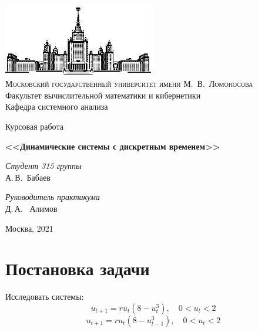 \documentclass[11pt]{article}
\begin{document}
	
	\thispagestyle{empty}
	
	\begin{center}
		\ \vspace{-3cm}
		
		\includegraphics[width=0.5\textwidth]{msu.eps}\\
		{\scshape Московский государственный университет имени М.~В.~Ломоносова}\\
		Факультет вычислительной математики и кибернетики\\
		Кафедра системного анализа
		
		\vfill
		
		{\LARGE Курсовая работа}
		
		\vspace{1cm}
		
		{\Huge\bfseries <<Динамические системы с дискретным временем>>}
	\end{center}
	
	\vspace{1cm}
	
	\begin{flushright}
		\large
		\textit{Студент 315 группы}\\
		А.\,В.~Бабаев
		
		\vspace{5mm}
		
		\textit{Руководитель практикума}\\
		Д.\,А.~ Алимов
	\end{flushright}
	
	\vfill
	
	\begin{center}
		Москва, 2021
	\end{center}
	
	\newpage
	\tableofcontents
	\newpage
	
	{\vspace*{-2cm} \hspace*{-1cm}\section{Постановка задачи}}

	{\hspace{0.4cm}Исследовать системы:}
	\begin{equation}
	 u_{t+1} = ru_t(8 - u_t^3), \quad 0 < u_t < 2  
	 \label{eq:ref1}
	\end{equation}
	\begin{equation}
	 u_{t+1} = ru_t(8 - u_{t-1}^3), \quad 0 < u_t < 2
	 \label{eq:ref2}
	\end{equation}
	
\end{document}
